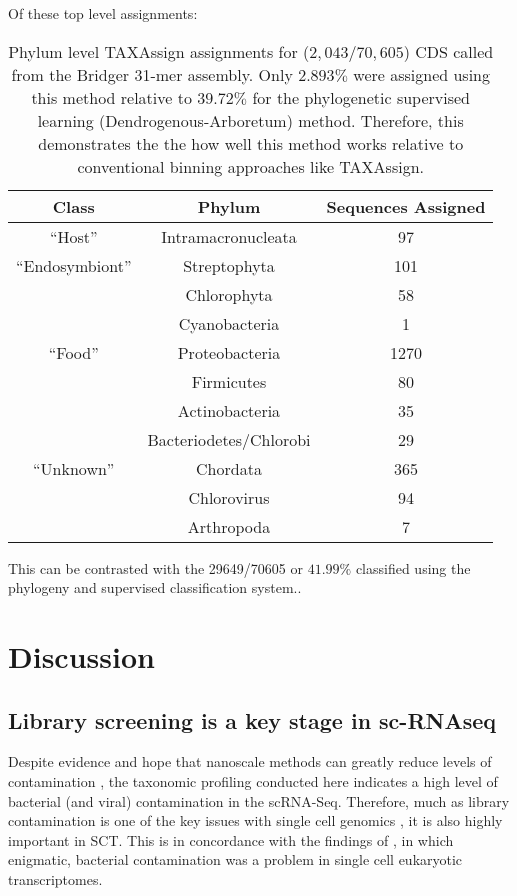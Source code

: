 Of these top level assignments:
\begin{table}
    \centering
	\begin{tabular}{| c | c | c |}
\hline
\textbf{Class} & \textbf{Phylum} & \textbf{Sequences Assigned} \\
\hline
``Host'' & Intramacronucleata & 97 \\
``Endosymbiont'' & Streptophyta & 101 \\
				 & Chlorophyta & 58 \\
				 & Cyanobacteria & 1 \\
``Food'' & Proteobacteria & 1270 \\
	& Firmicutes & 80 \\
	& Actinobacteria & 35 \\
	& Bacteriodetes/Chlorobi & 29\\
``Unknown'' & Chordata & 365 \\

& Chlorovirus & 94 \\ 
			& Arthropoda & 7 \\
			\hline 
	\end{tabular}
    \caption[TAXAssign Taxonomic Assignments]{Phylum level TAXAssign assignments for (\(2,043/70,605\)) CDS called from the Bridger 31-mer assembly.
            Only \(2.893\%\) were assigned using this method relative to  \(39.72\%\) for 
        the phylogenetic supervised learning (Dendrogenous-Arboretum) method.  Therefore, this demonstrates the
        the how well this method works relative to conventional binning approaches like TAXAssign.}
	\label{tab:taxassign}
\end{table}

This can be contrasted with the 29649/70605 or \(41.99\%\) classified 
using the phylogeny and supervised classification system..

\section{Discussion}

\subsection{Library screening is a key stage in sc-RNAseq}

Despite evidence and hope that nanoscale methods can greatly reduce levels of contamination \citep{Blainey2011}, 
the taxonomic profiling conducted here
indicates a high level of bacterial (and viral) contamination in the scRNA-Seq.  
Therefore, much as library contamination is one of the key issues with single cell genomics \citep{Blainey2013,Lusk2014}, it is also highly
important in SCT.  This is in concordance with the findings of \citep{Kolisko2014}, 
in which enigmatic, bacterial contamination was a problem in single cell eukaryotic
transcriptomes.   

